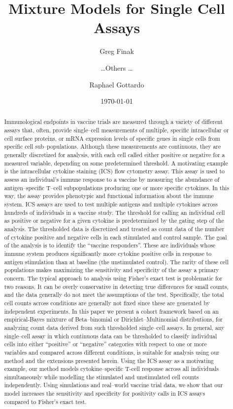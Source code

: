 \documentclass[11pt]{article}
\title{Mixture Models for Single Cell Assays}
\author[1]{Greg Finak}
\author[1]{\ldots Others \ldots}
\author[1]{Raphael Gottardo}
\affil[1]{Vaccine and Infectious Disease Division, Fred Hutchinson Cancer Research Center (FHCRC), Seattle, WA}
\date{\today}
\begin{document}
\maketitle
\begin{abstract}
Immunological endpoints in vaccine trials are measured through a variety of different assays that, often, provide single--cell measurements of multiple, specific intracellular or cell surface proteins, or mRNA expression levels of specific genes in single cells from specific cell sub--populations. Although these measurements are continuous, they are generally discretized for analysis, with each cell called either positive or negative for a measured variable, depending on some predetermined threshold. A motivating example is the intracellular cytokine staining (ICS) flow cytometry assay. This assay is used to assess an individual's immune response to a vaccine by measuring the abundance of antigen--specific T--cell subpopulations producing one or more specific cytokines. In this way, the assay provides phenotypic and functional information about the immune system. ICS assays are used to test multiple antigens and multiple cytokines across hundreds of individuals in a vaccine study. The threshold for calling an individual cell as positive or negative for a given cytokine is predetermined by the gating step of the analysis. The thresholded data is discretized and treated as count data of the number of cytokine positive and negative cells in each stimulated and control sample. The goal of the analysis is to identify the ``vaccine responders''. These are individuals whose immune system produces significantly more cytokine positive cells in response to antigen stimulation than at baseline (the unstimulated control). The rarity of these cell populations makes maximizing the sensitivity and specificity of the assay a primary concern. The typical approach to analysis using Fisher's exact test is problematic for two reasons. It can be overly conservative in detecting true differences for small counts, and the data generally do not meet the assumptions of the test. Specifically, the total cell counts across conditions are generally not fixed since these are generated by independent experiments.  In this paper we present a cohort framework based on an empirical-Bayes mixture of Beta--binomial or Dirichlet--Multinomial distributions, for analyzing count data derived from such thresholded single--cell assays. In general, any single--cell assay in which continuous data can be thresholded to classify individual cells into either ``positive'' or ``negative'' categories with respect to one or more variables and compared across different conditions, is suitable for analysis using our method and the extensions presented herein. Using the ICS assay as a motivating example, our method models cytokine–specific T-cell response across all individuals simultaneously while modelling the stimulated and unstimulated cell counts independently. Using simulations and real--world vaccine trial data, we show that our model increases the sensitivity and specificity for positivity calls in ICS assays compared to Fisher's exact test.
\end{abstract}
\end{document}
